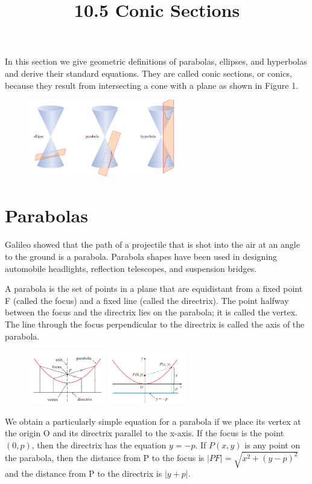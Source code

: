\documentclass{article}
\title{10.5 Conic Sections}
\date{}
\author{}
\begin{document}
\maketitle
In this section we give geometric definitions of parabolas, ellipses, and hyperbolas and derive their standard equations. They are called conic sections, or conics, because they result from intersecting a cone with a plane as shown in Figure 1.
\begin{figure}[htbp]
    \centering
    \includegraphics[width=0.6\textwidth]{graph50.png}
\end{figure}


\section*{Parabolas}
Galileo showed that the path of a projectile that is shot into the air at an angle to the ground is a parabola. Parabola shapes have been used in designing automobile headlights, reflection telescopes, and suspension bridges.

A parabola is the set of points in a plane that are equidistant from a fixed point F (called the focus) and a fixed line (called the directrix). The point halfway between the focus and the directrix lies on the parabola; it is called the vertex. The line through the focus perpendicular to the directrix is called the axis of the parabola.
\begin{figure}[htbp]
    \centering
    \includegraphics[width=0.3\textwidth]{graph51.png}
    \includegraphics[width=0.3\textwidth]{graph52.png}
\end{figure}
We obtain a particularly simple equation for a parabola if we place its vertex at the origin O and its directrix parallel to the x-axis. If the focus is the point $(0,p)$, then the directrix has the equation $y=-p$. If $P(x,y)$ is any point on the parabola, then the distance from P to the focus is $|PF| = \sqrt{x^2 + (y-p)^2}$ and the distance from P to the directrix is $|y+p|$.
\end{document}
